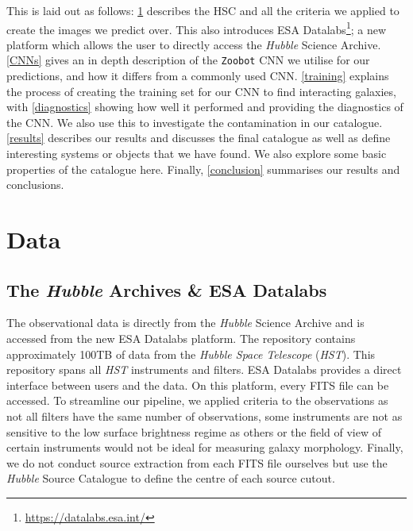 This \DIFdelbegin {}\DIFdelend \DIFaddbegin {}\DIFaddend is laid out as follows: \DIFdelbegin {}\DIFdelend \DIFaddbegin {}\DIFaddend \ref{data} describes the HSC and all the criteria we applied to create the images we predict over. This \DIFdelbegin {}\DIFdelend \DIFaddbegin {}\DIFaddend also introduces ESA Datalabs\footnote{\url{https://datalabs.esa.int/}}; a new platform which allows the user to directly access the \emph{Hubble} Science Archive. \DIFdelbegin {}\DIFdelend \DIFaddbegin {}\DIFaddend \ref{CNNs} gives an in depth description of the \texttt{Zoobot} CNN we utilise for our predictions, and how it differs from a commonly used CNN. \DIFdelbegin {}\DIFdelend \DIFaddbegin {}\DIFaddend \ref{training} explains the process of creating the training set for our CNN to find interacting galaxies, with \DIFdelbegin {}\DIFdelend \DIFaddbegin {}\DIFaddend \ref{diagnostics} showing how well it performed and providing the diagnostics of the CNN. We also use this \DIFdelbegin {}\DIFdelend \DIFaddbegin {}\DIFaddend to investigate the contamination in our catalogue. \DIFdelbegin {}\DIFdelend \DIFaddbegin {}\DIFaddend \ref{results} describes our results and discusses the final catalogue as well as define interesting systems or objects that we have found. We also explore some basic properties of the catalogue here. Finally, \DIFdelbegin {}\DIFdelend \DIFaddbegin {}\DIFaddend \ref{conclusion} summarises our results and conclusions.



\section{Data}\label{data}
\subsection{The \emph{Hubble} Archives \& ESA Datalabs}
\noindent The observational data is directly from the \emph{Hubble} Science Archive and is accessed from the new ESA Datalabs platform. The repository contains approximately 100TB of data from the \emph{Hubble Space Telescope} (\emph{HST}). This repository spans all \emph{HST} instruments and filters. ESA Datalabs provides a direct interface between users and the data. On this platform, every \DIFdelbegin {}\DIFdelend \DIFaddbegin {}\DIFaddend FITS file can be accessed. To streamline our pipeline, we applied criteria to the observations as not all filters have the same number of observations, some instruments are not as sensitive to the low surface brightness regime as others or the field of view of certain instruments would not be ideal for measuring galaxy morphology. Finally, we do not conduct source extraction from each FITS file ourselves but use the \emph{Hubble} Source Catalogue \citep[][hereafter HSC]{2016AJ....151..134W} to define the centre of each source cutout.

